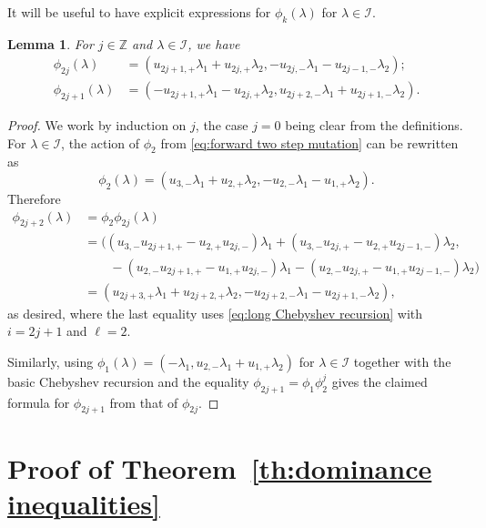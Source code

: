 \documentclass{amsart}
\newtheorem{lemma}[theorem]{Lemma}
\numberwithin{theorem}{section}
\newcommand{\cI}{\mathcal{I}}
\newcommand{\ZZ}{\mathbb{Z}}
\begin{document}
  It will be useful to have explicit expressions for $\phi_k(\lambda)$ for $\lambda\in\cI$.
  \begin{lemma}
    \label{le:imaginary transformations}
    For $j\in\ZZ$ and $\lambda\in\cI$, we have
    \begin{align*}
      \phi_{2j}(\lambda)&=(u_{2j+1,+}\lambda_1+u_{2j,+}\lambda_2,-u_{2j,-}\lambda_1-u_{2j-1,-}\lambda_2);\\
      \phi_{2j+1}(\lambda)&=(-u_{2j+1,+}\lambda_1-u_{2j,+}\lambda_2,u_{2j+2,-}\lambda_1+u_{2j+1,-}\lambda_2).
    \end{align*}
  \end{lemma}
  \begin{proof}
    We work by induction on $j$, the case $j=0$ being clear from the definitions.
    For $\lambda\in\cI$, the action of $\phi_2$ from \eqref{eq:forward two step mutation} can be rewritten as
    \[\phi_2(\lambda)=(u_{3,-}\lambda_1+u_{2,+}\lambda_2,-u_{2,-}\lambda_1-u_{1,+}\lambda_2).\]
    Therefore
    \begin{align*}
      \phi_{2j+2}(\lambda)&=\phi_2\phi_{2j}(\lambda)\\
      &=\big( (u_{3,-}u_{2j+1,+}-u_{2,+}u_{2j,-})\lambda_1+(u_{3,-}u_{2j,+}-u_{2,+}u_{2j-1,-})\lambda_2,\\
      &\qquad -(u_{2,-}u_{2j+1,+}-u_{1,+}u_{2j,-})\lambda_1-(u_{2,-}u_{2j,+}-u_{1,+}u_{2j-1,-})\lambda_2 \big)\\
      &=(u_{2j+3,+}\lambda_1+u_{2j+2,+}\lambda_2, -u_{2j+2,-}\lambda_1-u_{2j+1,-}\lambda_2),
    \end{align*}
    as desired, where the last equality uses \eqref{eq:long Chebyshev recursion} with $i=2j+1$ and $\ell=2$.

    Similarly, using $\phi_1(\lambda)=(-\lambda_1,u_{2,-}\lambda_1+u_{1,+}\lambda_2)$ for $\lambda\in\cI$ together with the basic Chebyshev recursion and the equality $\phi_{2j+1}=\phi_1\phi_2^j$ gives the claimed formula for $\phi_{2j+1}$ from that of $\phi_{2j}$.
  \end{proof}


\section{Proof of Theorem~\ref{th:dominance inequalities}}
\end{document}
